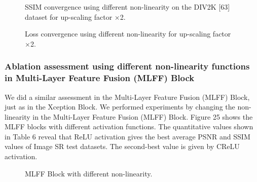 \documentclass[twocolumn]{svjour3}          %
\begin{document}
\begin{figure}
    \centering
    \caption{SSIM convergence using different non-linearity on the DIV2K [63] dataset for up-scaling factor ×2.}
    \label{fig:23}
\end{figure}

\begin{figure}
    \centering
    \caption{Loss convergence using different non-linearity for up-scaling factor ×2.}
    \label{fig:24}
\end{figure}

\subsubsection{Ablation assessment using different non-linearity functions in Multi-Layer Feature Fusion (MLFF) Block}

We did a similar assessment in the Multi-Layer Feature Fusion (MLFF) Block, just as in the Xception Block. We performed experiments by changing the non-linearity in the Multi-Layer Feature Fusion (MLFF) Block. Figure 25 shows the MLFF blocks with different activation functions. The quantitative values shown in Table 6 reveal that ReLU activation gives the best average PSNR and SSIM values of Image SR test datasets. The second-best value is given by CReLU activation.
\begin{figure}
  \centering
   \caption {MLFF Block with different non-linearity.}
    \label{fig:25}
\end{figure}
\end{document}
